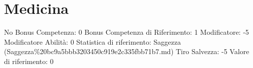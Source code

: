 \section{Medicina}\label{medicina}

\begin{description}
\tightlist
\item[Tags: ABI]
No Bonus Competenza: 0 Bonus Competenza di Riferimento: 1 Modificatore:
-5 Modificatore Abilità: 0 Statistica di riferimento: Saggezza
(Saggezza\%20bc9a5bbb3203450c919e2c335fbb71b7.md) Tiro Salvezza: -5
Valore di riferimento: 0
\end{description}
